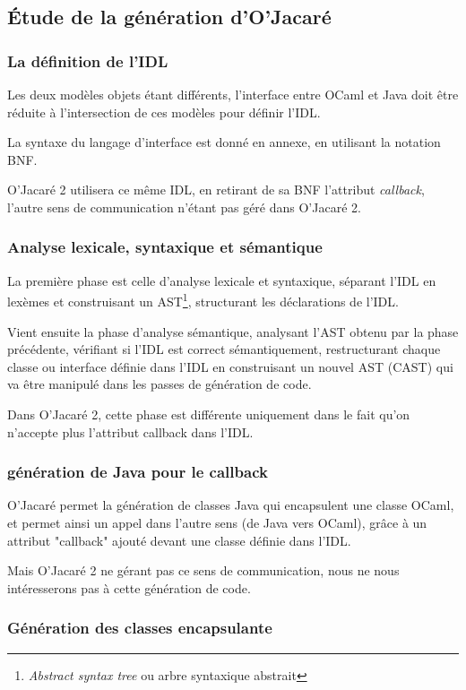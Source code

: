 \documentclass[a4paper, 11pt]{article}
\begin{document}
\subsection{\'Etude de la génération d'O'Jacaré}\label{2.1}
\subsubsection{La définition de l'IDL}
Les deux modèles objets étant différents, l'interface entre OCaml et Java doit être réduite à l'intersection de ces modèles pour définir l'IDL.

La syntaxe du langage d'interface est donné en annexe, en utilisant la
notation BNF.

O'Jacaré 2 utilisera ce même IDL, en retirant de sa BNF l'attribut \emph{callback}, l'autre sens de communication n'étant pas géré dans O'Jacaré 2.

\subsubsection{Analyse lexicale, syntaxique et sémantique }
La première phase est celle d'analyse lexicale et syntaxique,
séparant l'IDL en lexèmes et construisant un AST\footnote{\emph{Abstract syntax tree} ou arbre syntaxique abstrait}, structurant les déclarations de l'IDL.

Vient ensuite la phase d'analyse sémantique, analysant l'AST obtenu par la
phase précédente, vérifiant si l'IDL est correct sémantiquement,
restructurant chaque classe ou interface définie dans l'IDL en construisant un nouvel AST (CAST) qui va être manipulé dans les passes de génération de code.

Dans O'Jacaré 2, cette phase est différente uniquement dans le fait qu'on n'accepte plus l'attribut callback dans l'IDL. 

\subsubsection{génération de Java pour le callback}
O'Jacaré permet la génération de classes Java qui encapsulent une classe OCaml, et permet ainsi un appel dans l'autre sens (de Java vers OCaml), grâce à un attribut "callback" ajouté devant une classe définie dans l'IDL.

Mais O'Jacaré 2 ne gérant pas ce sens de communication, nous ne nous intéresserons pas à cette génération de code.

\subsubsection{Génération des classes encapsulante}
\end{document}
